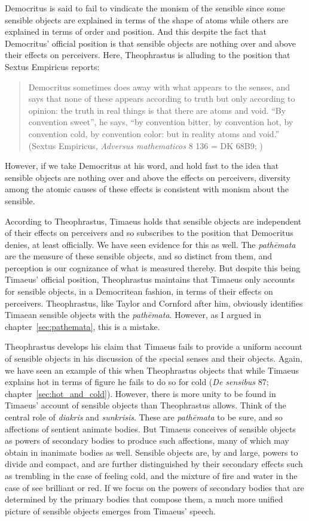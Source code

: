 Democritus is said to fail to vindicate the monism of the sensible since some sensible objects are explained in terms of the shape of atoms while others are explained in terms of order and position. And this despite the fact that Democritus' official position is that sensible objects are nothing over and above their effects on perceivers. Here, Theophrastus is alluding to the position that Sextus Empiricus reports:
\begin{quote}
	Democritus sometimes does away with what appears to the senses, and says that none of these appears according to truth but only according to opinion: the truth in real things is that there are atoms and void. ``By convention sweet'', he says, ``by convention bitter, by convention hot, by convention cold, by convention color: but in reality atoms and void.'' (Sextus Empiricus, \emph{Adversus mathematicos} 8 136 = DK 68B9; \citealt[410]{Kirk:1983ly})
\end{quote}
However, if we take Democritus at his word, and hold fast to the idea that sensible objects are nothing over and above the effects on perceivers, diversity among the atomic causes of these effects is consistent with monism about the sensible.

According to Theophrastus, Timaeus holds that sensible objects are independent of their effects on perceivers and so subscribes to the position that Democritus denies, at least officially. We have seen evidence for this as well. The \emph{pathēmata} are the measure of these sensible objects, and so distinct from them, and perception is our cognizance of what is measured thereby. But despite this being Timaeus' official position, Theophrastus maintains that Timaeus only accounts for sensible objects, in a Democritean fashion, in terms of their effects on perceivers. Theophrastus, like Taylor and Cornford after him, obviously identifies Timaean sensible objects with the \emph{pathēmata}. However, as I argued in chapter~\ref{sec:pathemata}, this is a mistake.

Theophrastus develops his claim that Timaeus fails to provide a uniform account of sensible objects in his discussion of the special senses and their objects. Again, we have seen an example of this when Theophrastus objects that while Timaeus explains hot in terms of figure he fails to do so for cold (\emph{De sensibus} 87; chapter~\ref{sec:hot_and_cold}). However, there is more unity to be found in Timaeus' account of sensible objects than Theophrastus allows. Think of the central role of \emph{diakris} and \emph{sunkrisis}. These are \emph{pathēmata} to be sure, and so affections of sentient animate bodies. But Timaeus conceives of sensible objects as powers of secondary bodies to produce such affections, many of which may obtain in inanimate bodies as well. Sensible objects are, by and large, powers to divide and compact, and are further distinguished by their secondary effects such as trembling in the case of feeling cold, and the mixture of fire and water in the case of see brilliant or red. If we focus on the powers of secondary bodies that are determined by the primary bodies that compose them, a much more unified picture of sensible objects emerges from Timaeus' speech.


